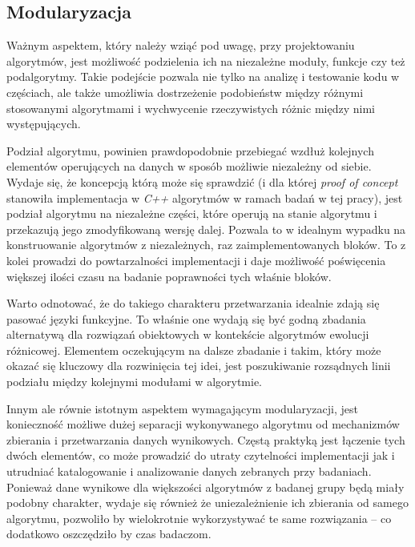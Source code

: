 \documentclass[12pt,a4paper]{report}
\begin{document}
{{{{{{{\subsection{Modularyzacja}
\label{modlsubs}
\par{
Ważnym aspektem, który należy wziąć pod uwagę, przy projektowaniu algorytmów, jest możliwość podzielenia ich na niezależne moduły, funkcje czy też podalgorytmy. Takie podejście pozwala nie tylko na analizę i testowanie kodu w częściach, ale także umożliwia dostrzeżenie podobieństw między różnymi stosowanymi algorytmami i wychwycenie rzeczywistych różnic między nimi występujących.
}
\par{
Podział algorytmu, powinien prawdopodobnie przebiegać wzdłuż kolejnych elementów operujących na danych w sposób możliwie niezależny od siebie. Wydaje się, że koncepcją którą może się sprawdzić (i dla której \emph{proof of concept} stanowiła implementacja w \emph{C++} algorytmów w ramach badań w tej pracy), jest podział algorytmu na niezależne części, które operują na stanie algorytmu i przekazują jego zmodyfikowaną wersję dalej. Pozwala to w idealnym wypadku na konstruowanie algorytmów z niezależnych, raz zaimplementowanych bloków. To z kolei prowadzi do powtarzalności implementacji i daje możliwość poświęcenia większej ilości czasu na badanie poprawności tych właśnie bloków.
}
\par{
Warto odnotować, że do takiego charakteru przetwarzania idealnie zdają się pasować języki funkcyjne. To właśnie one wydają się być godną zbadania alternatywą dla rozwiązań obiektowych w kontekście algorytmów ewolucji różnicowej. Elementem oczekującym na dalsze zbadanie i takim, który może okazać się kluczowy dla rozwinięcia tej idei, jest poszukiwanie rozsądnych linii podziału między kolejnymi modułami w algorytmie.
}
\par{
Innym ale równie istotnym aspektem wymagającym modularyzacji, jest konieczność możliwe dużej separacji wykonywanego algorytmu od mechanizmów zbierania i przetwarzania danych wynikowych. Częstą praktyką jest łączenie tych dwóch elementów, co może prowadzić do utraty czytelności implementacji jak i utrudniać katalogowanie i analizowanie danych zebranych przy badaniach. Ponieważ dane wynikowe dla większości algorytmów z badanej grupy będą miały podobny charakter, wydaje się również że uniezależnienie ich zbierania od samego algorytmu, pozwoliło by wielokrotnie wykorzystywać te same rozwiązania -- co dodatkowo oszczędziło by czas badaczom.
}
}}}}}}}
\end{document}
